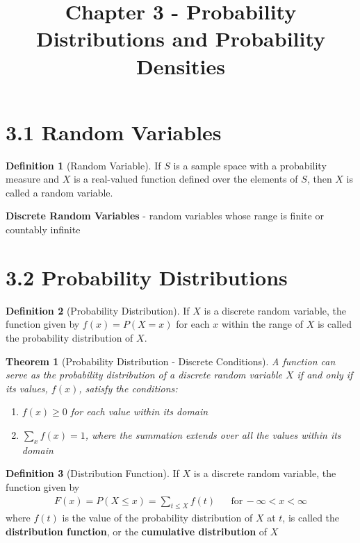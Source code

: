 \documentclass[
10pt,reqno
]{amsart}
\title{Chapter 3 - Probability Distributions and Probability Densities}
\newtheorem{thm}{Theorem}[section]
\theoremstyle{definition}
\newtheorem{definition}{Definition}[section]
\begin{document}
\maketitle


\section*{3.1 Random Variables}

\begin{definition}[Random Variable]
If \(S\) is a sample space with a probability measure and \(X\) is a real-valued function defined over the elements of \(S\), then \(X\) is called a random variable.
\end{definition}

\textbf{Discrete Random Variables} - random variables whose range is finite or countably infinite

\section*{3.2 Probability Distributions}

\begin{definition}[Probability Distribution]
If \(X\) is a discrete random variable, the function given by \(f(x)=P(X=x)\) for each \(x\) within the range of \(X\) is called the probability distribution of \(X\).
\end{definition}

\begin{thm}[Probability Distribution - Discrete Conditions]
\label{thm:ProbDistDiscrete}
A function can serve as the probability distribution of a discrete random variable \(X\) if and only if its values, \(f(x)\), satisfy the conditions:
\begin{enumerate}
	\item \(f(x) \ge 0\) for each value within its domain
	\item \(\sum_{x} f(x)=1\), where the summation extends over all the values within its domain
\end{enumerate}
\end{thm}

\begin{definition}[Distribution Function]
If \(X\) is a discrete random variable, the function given by
\begin{align*}
F(x)=P(X \leq x) = \sum_{t \leq X} f(t) && \text{for} \,-\infty < x < \infty
\end{align*}
where \(f(t)\) is the value of the probability distribution of \(X\) at \(t\), is called the \textbf{distribution function}, or the \textbf{cumulative distribution} of \(X\)
\end{definition}
\end{document}
